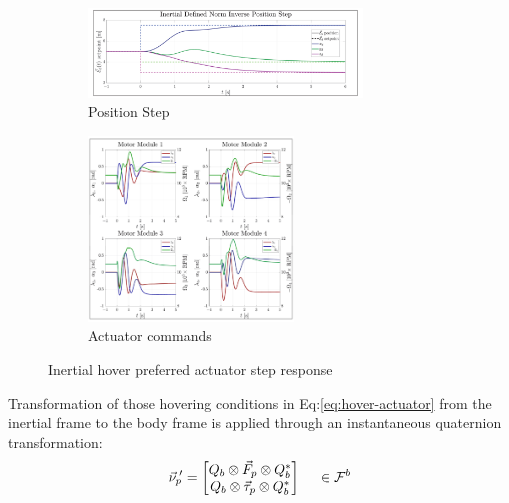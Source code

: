 \begin{figure}[htbp]
\ContinuedFloat
\begin{subfigure}{\textwidth}
\vspace{-2pt}
\centering
\includegraphics[width=0.8\textwidth]{graphs/inertial_norm_position}
\vspace{-6pt}
\caption{Position Step}
\label{fig:inertia_norm_position}
\end{subfigure}
\begin{subfigure}{\textwidth}
\centering
\includegraphics[width=0.6\textwidth]{graphs/inertial_norm_input}
\vspace{-6pt}
\caption{Actuator commands}
\label{fig:inertia_norm_input}
\end{subfigure}
\vspace{-10pt}
\caption{Inertial hover preferred actuator step response}
\label{fig:inertial-norm-step}
\vspace{-6pt}
\end{figure}
\par
Transformation of those hovering conditions in Eq:\ref{eq:hover-actuator} from the inertial frame to the body frame is applied through an instantaneous quaternion transformation:
\begin{equation}
\vec{\nu}_p\text{}\hspace{-2pt}'=\begin{bmatrix}
Q_b\otimes\vec{F}_p\otimes Q_b^*\\
Q_b\otimes\vec{\tau}_p\otimes Q_b^*
\end{bmatrix}~~~~\in\mathcal{F}^{b}
\end{equation}
